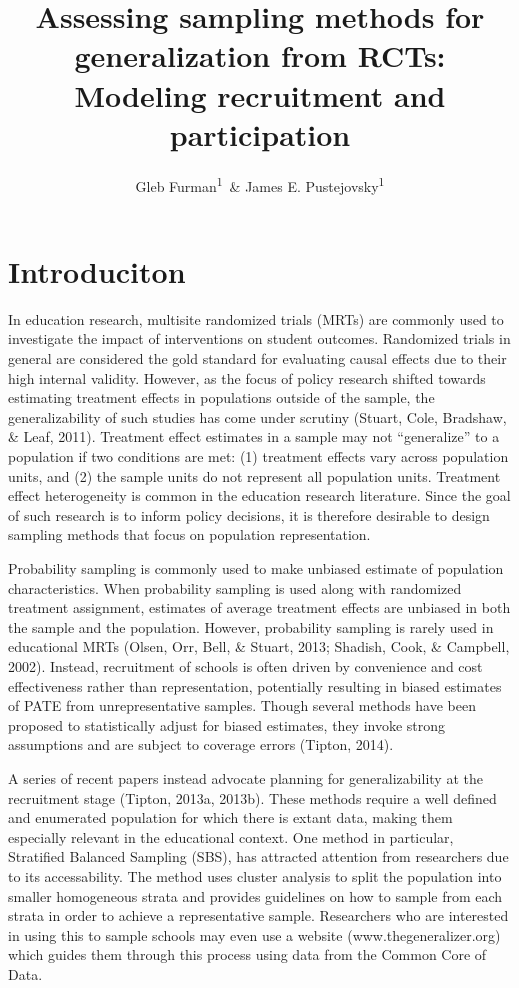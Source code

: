 \documentclass[man]{apa6}
\title{Assessing sampling methods for generalization from RCTs: Modeling recruitment and participation}
\author{Gleb Furman\textsuperscript{1}~\& James E. Pustejovsky\textsuperscript{1}}
\date{}
\affiliation{
\vspace{0.5cm}
\textsuperscript{1} University of Texas at Austin}
\begin{document}
\maketitle

\hypertarget{introduciton}{%
\section{Introduciton}\label{introduciton}}

In education research, multisite randomized trials (MRTs) are commonly used to investigate the impact of interventions on student outcomes. Randomized trials in general are considered the gold standard for evaluating causal effects due to their high internal validity. However, as the focus of policy research shifted towards estimating treatment effects in populations outside of the sample, the generalizability of such studies has come under scrutiny (Stuart, Cole, Bradshaw, \& Leaf, 2011). Treatment effect estimates in a sample may not \enquote{generalize} to a population if two conditions are met: (1) treatment effects vary across population units, and (2) the sample units do not represent all population units. Treatment effect heterogeneity is common in the education research literature. Since the goal of such research is to inform policy decisions, it is therefore desirable to design sampling methods that focus on population representation.

Probability sampling is commonly used to make unbiased estimate of population characteristics. When probability sampling is used along with randomized treatment assignment, estimates of average treatment effects are unbiased in both the sample and the population. However, probability sampling is rarely used in educational MRTs (Olsen, Orr, Bell, \& Stuart, 2013; Shadish, Cook, \& Campbell, 2002). Instead, recruitment of schools is often driven by convenience and cost effectiveness rather than representation, potentially resulting in biased estimates of PATE from unrepresentative samples. Though several methods have been proposed to statistically adjust for biased estimates, they invoke strong assumptions and are subject to coverage errors (Tipton, 2014).

A series of recent papers instead advocate planning for generalizability at the recruitment stage (Tipton, 2013a, 2013b). These methods require a well defined and enumerated population for which there is extant data, making them especially relevant in the educational context. One method in particular, Stratified Balanced Sampling (SBS), has attracted attention from researchers due to its accessability. The method uses cluster analysis to split the population into smaller homogeneous strata and provides guidelines on how to sample from each strata in order to achieve a representative sample. Researchers who are interested in using this to sample schools may even use a website (www.thegeneralizer.org) which guides them through this process using data from the Common Core of Data.
\end{document}
